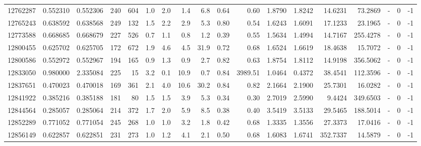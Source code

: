 \begin{tabular}{rrrrrrrrrrrrrrrlrr}
  12762287 & 0.552310 &   0.552306 &  240 &  604 &      1.0 &      2.0 &     1.4 &      6.8 &       0.64 &        0.60 &  1.8790 &  1.8242 &   14.6231 &   73.2869 &             - &        0 &         -1 \\
  12765243 & 0.638592 &   0.638568 &  249 &  132 &      1.5 &      2.2 &     2.9 &      5.3 &       0.80 &        0.54 &  1.6243 &  1.6091 &   17.1233 &   23.1965 &             - &        0 &         -1 \\
  12773588 & 0.668685 &   0.668679 &  227 &  526 &      0.7 &      1.1 &     0.8 &      1.2 &       0.39 &        0.55 &  1.5634 &  1.4994 &   14.7167 &  255.4278 &             - &        0 &         -1 \\
  12800455 & 0.625702 &   0.625705 &  172 &  672 &      1.9 &      4.6 &     4.5 &     31.9 &       0.72 &        0.68 &  1.6524 &  1.6619 &   18.4638 &   15.7072 &             - &        0 &         -1 \\
  12800586 & 0.552972 &   0.552967 &  194 &  165 &      0.9 &      1.3 &     0.9 &      2.7 &       0.82 &        0.63 &  1.8754 &  1.8112 &   14.9198 &  356.5062 &             - &        0 &         -1 \\
  12833050 & 0.980000 &   2.335084 &  225 &   15 &      3.2 &      0.1 &    10.9 &      0.7 &       0.84 &     3989.51 &  1.0464 &  0.4372 &   38.4541 &  112.3596 &             - &        0 &         -1 \\
  12837651 & 0.470023 &   0.470018 &  169 &  361 &      2.1 &      4.0 &    10.6 &     30.2 &       0.84 &        0.82 &  2.1664 &  2.1900 &   25.7301 &   16.0282 &             - &        0 &         -1 \\
  12841922 & 0.385216 &   0.385188 &  181 &   80 &      1.5 &      1.5 &     3.9 &      5.3 &       0.34 &        0.30 &  2.7019 &  2.5990 &    9.4424 &  349.6503 &             - &        0 &         -1 \\
  12844564 & 0.285057 &   0.285064 &  214 &  372 &      1.7 &      2.0 &     5.9 &      8.5 &       0.38 &        0.40 &  3.5419 &  3.5133 &   29.5465 &  188.5014 &             - &        0 &         -1 \\
  12852289 & 0.771052 &   0.771054 &  245 &  268 &      1.0 &      1.0 &     3.2 &      1.8 &       0.42 &        0.68 &  1.3335 &  1.3556 &   27.3373 &   17.0416 &             - &        0 &         -1 \\
  12856149 & 0.622857 &   0.622851 &  231 &  273 &      1.0 &      1.2 &     4.1 &      2.1 &       0.50 &        0.68 &  1.6083 &  1.6741 &  352.7337 &   14.5879 &             - &        0 &         -1 \\

\end{tabular}
